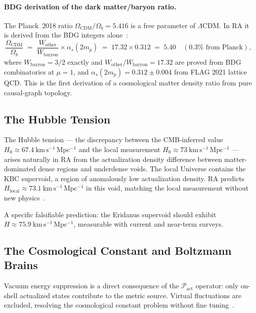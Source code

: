 \documentclass[11pt,a4paper]{article}
\newcommand{\Pact}{\mathcal{P}_{\mathrm{act}}}
\begin{document}
\paragraph{BDG derivation of the dark matter/baryon ratio.}
The Planck~2018 ratio $\Omega_{\mathrm{CDM}}/\Omega_b = 5.416$ is a free
parameter of $\Lambda$CDM.  In RA it is derived from the BDG integers
alone~\citep{Sandeman2026RASM,Sandeman2026BDG}:
\begin{equation}
  \frac{\Omega_{\mathrm{CDM}}}{\Omega_b}
  \;=\; \frac{W_{\mathrm{other}}}{W_{\mathrm{baryon}}} \times \alpha_s(2m_p)
  \;=\; 17.32 \times 0.312 \;=\; 5.40
  \quad (0.3\%\text{ from Planck}),
  \label{eq:f0_foundation}
\end{equation}
where $W_{\mathrm{baryon}} = 3/2$ exactly and $W_{\mathrm{other}}/W_{\mathrm{baryon}} = 17.32$
are proved from BDG combinatorics at $\mu=1$, and $\alpha_s(2m_p) = 0.312\pm 0.004$
from FLAG 2021 lattice QCD.  This is the first derivation of a cosmological
matter density ratio from pure causal-graph topology.

\subsection{The Hubble Tension}

The Hubble tension --- the discrepancy between the CMB-inferred value
$H_0 \approx 67.4~\mathrm{km\,s^{-1}\,Mpc^{-1}}$ and the local
measurement $H_0 \approx 73~\mathrm{km\,s^{-1}\,Mpc^{-1}}$ --- arises
naturally in RA from the actualization density difference between
matter-dominated dense regions and underdense voids. The local Universe
contains the KBC supervoid, a region of anomalously low actualization
density. RA predicts $H_{\mathrm{local}} \approx 73.1~\mathrm{km\,s^{-1}
\,Mpc^{-1}}$ in this void, matching the local measurement without
new physics~\citep{Sandeman2026RAGC, Sandeman2026RADM}.

A specific falsifiable prediction: the Eridanus supervoid should exhibit
$H \approx 75.9~\mathrm{km\,s^{-1}\,Mpc^{-1}}$, measurable with current
and near-term surveys.

\subsection{The Cosmological Constant and Boltzmann Brains}

Vacuum energy suppression is a direct consequence of the $\Pact$
operator: only on-shell actualized states contribute to the metric source.
Virtual fluctuations are excluded, resolving the cosmological constant
problem without fine tuning~\citep{Sandeman2026RAGC}.
\end{document}
